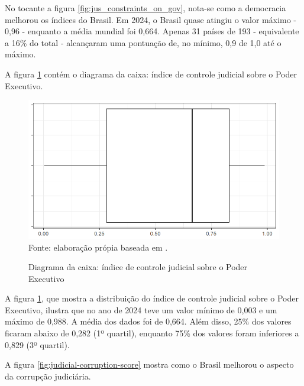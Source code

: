 No tocante a figura \ref{fig:jus_constraints_on_gov}, nota-se como a democracia melhorou os índices do Brasil. Em 2024, o Brasil quase atingiu o valor máximo - 0,96 - enquanto a média mundial foi 0,664. Apenas 31 países de 193 - equivalente a 16\% do total - alcançaram uma pontuação de, no mínimo, 0,9 de 1,0 até o máximo.

A figura \ref{fig:quartis_controle_jus_sobre_gov} contém o diagrama da caixa: índice de controle judicial sobre o Poder Executivo.

\begin{figure}[H]
    \centering
    \caption{Diagrama da caixa: índice de controle judicial sobre o Poder Executivo}
    \includegraphics[width=1\linewidth]{figuras/quartis_controle_jus_sobre_gov.png}
    \label{fig:quartis_controle_jus_sobre_gov}
    \footnotesize{Fonte: elaboração própia baseada em \cite{jus_constraints_on_gov}.}
\end{figure}

A figura \ref{fig:quartis_controle_jus_sobre_gov}, que mostra a distribuição do índice de controle judicial sobre o Poder Executivo, ilustra que no ano de 2024 teve um valor mínimo de 0,003 e um máximo de 0,988. A média dos dados foi de 0,664. Além disso, 25\% dos valores ficaram abaixo de 0,282 (1º quartil), enquanto 75\% dos valores foram inferiores a 0,829 (3º quartil).

A figura \ref{fig:judicial-corruption-score} mostra como o Brasil melhorou o aspecto da corrupção judiciária. 

